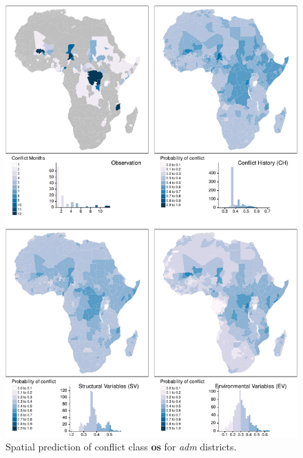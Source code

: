 \documentclass[a4paper,11pt]{article}
\begin{document}
\begin{tiny}
\begin{figure}[H]
{\centering \includegraphics{thesis_files/figure-latex/appendix-spatial-adm-os-1} 

}

\caption[Spatial prediction of conflict class \textbf{os} for \textit{adm} districts.]{Spatial prediction of conflict class \textbf{os} for \textit{adm} districts.}\label{fig:appendix-spatial-adm-os}
\end{figure}
\begin{figure}[H]


\end{figure}
\end{tiny}
\end{document}
